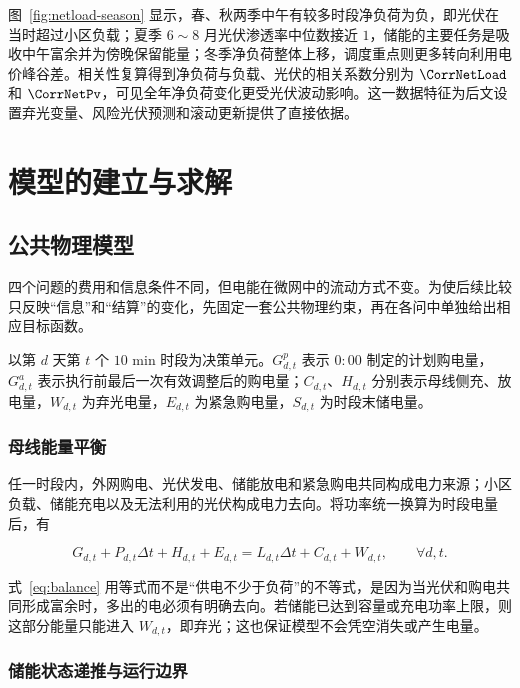 图~\ref{fig:netload-season} 显示，春、秋两季中午有较多时段净负荷为负，即光伏在当时超过小区负载；夏季 $6\sim8$ 月光伏渗透率中位数接近 $1$，储能的主要任务是吸收中午富余并为傍晚保留能量；冬季净负荷整体上移，调度重点则更多转向利用电价峰谷差。相关性复算得到净负荷与负载、光伏的相关系数分别为 $\CorrNetLoad$ 和 $\CorrNetPv$，可见全年净负荷变化更受光伏波动影响。这一数据特征为后文设置弃光变量、风险光伏预测和滚动更新提供了直接依据。

\section{模型的建立与求解}

\subsection{公共物理模型}

四个问题的费用和信息条件不同，但电能在微网中的流动方式不变。为使后续比较只反映“信息”和“结算”的变化，先固定一套公共物理约束，再在各问中单独给出相应目标函数。

以第 $d$ 天第 $t$ 个 $10$ min 时段为决策单元。$G^p_{d,t}$ 表示 $0{:}00$ 制定的计划购电量，$G^a_{d,t}$ 表示执行前最后一次有效调整后的购电量；$C_{d,t}$、$H_{d,t}$ 分别表示母线侧充、放电量，$W_{d,t}$ 为弃光电量，$E_{d,t}$ 为紧急购电量，$S_{d,t}$ 为时段末储电量。

\subsubsection{母线能量平衡}

任一时段内，外网购电、光伏发电、储能放电和紧急购电共同构成电力来源；小区负载、储能充电以及无法利用的光伏构成电力去向。将功率统一换算为时段电量后，有

\begin{equation}
    G_{d,t}+P_{d,t}\Delta t+H_{d,t}+E_{d,t}
    =L_{d,t}\Delta t+C_{d,t}+W_{d,t},
    \qquad \forall d,t .
    \label{eq:balance}
\end{equation}

式~\eqref{eq:balance} 用等式而不是“供电不少于负荷”的不等式，是因为当光伏和购电共同形成富余时，多出的电必须有明确去向。若储能已达到容量或充电功率上限，则这部分能量只能进入 $W_{d,t}$，即弃光；这也保证模型不会凭空消失或产生电量。

\subsubsection{储能状态递推与运行边界}

